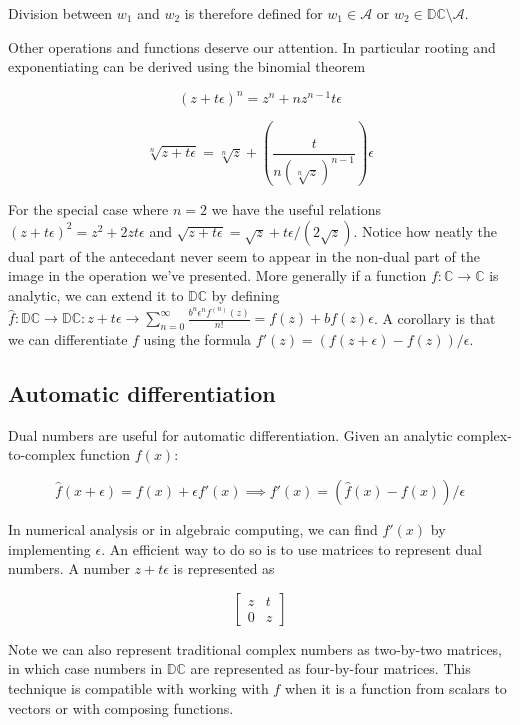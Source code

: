 \documentclass{article}
\newcommand{\C}{\mathbb{C}}
\newcommand{\DC}{\mathbb{DC}}
\newcommand{\A}{\mathcal{A}}
\newcommand{\e}{\epsilon}
\begin{document}
Division between $w_1$ and $w_2$ is therefore defined for $w_1 \in \A$ or $w_2 \in \DC \setminus \A$.

Other operations and functions deserve our attention. In particular rooting and exponentiating can be derived using the binomial theorem

\begin{equation}
(z + t\e)^n = z^n + n z^{n-1} t \e
\end{equation}

\begin{equation}
\sqrt[n]{z + t \e} = \sqrt[n]{z} + (\frac{t}{n(\sqrt[n]{z})^{n-1}}) \e
\end{equation}

For the special case where $n = 2$ we have the useful relations $(z+t\e)^2 = z^2 + 2zt\e$ and $\sqrt{z+t\e} = \sqrt{z} + t\e/(2 \sqrt{z})$. Notice how neatly the dual part of the antecedant never seem to appear in the non-dual part of the image in the operation we've presented. More generally if a function $f: \C \to \C$ is analytic, we can extend it to $\DC$ by defining $\hat{f}: \DC \to \DC: z + t\e \to \sum_{n=0}^{\infty} \frac{b^n \e^n f^{(n)}(z)}{n!} = f(z) + b f(z) \e$. A corollary is that we can differentiate $f$ using the formula $f'(z) = (f(z + \e) - f(z))/\e$.

\subsection{Automatic differentiation}

Dual numbers are useful for automatic differentiation. Given an analytic complex-to-complex function $f(x)$:

\begin{equation}
        \hat{f}(x + \e) = f(x) + \e f'(x) \implies f'(x) = (\hat{f}(x) - f(x))/\e
\end{equation}

In numerical analysis or in algebraic computing, we can find $f'(x)$ by implementing $\e$. An efficient way to do so is to use matrices to represent dual numbers. A number $z + t \e$ is represented as

$$
\begin{bmatrix}
z & t \\
0 & z
\end{bmatrix}
$$

Note we can also represent traditional complex numbers as two-by-two matrices, in which case numbers in $\DC$ are represented as four-by-four matrices. This technique is compatible with working with $f$ when it is a function from scalars to vectors or with composing functions.
\end{document}
